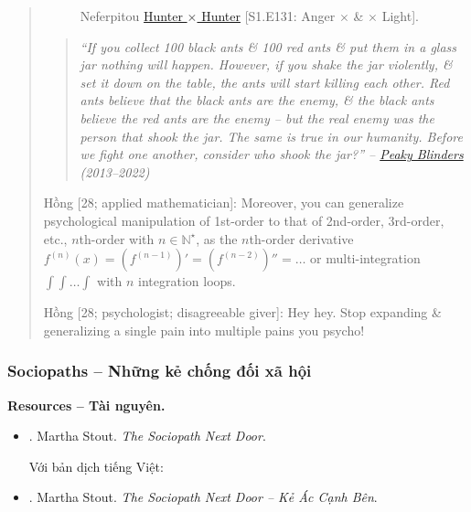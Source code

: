\documentclass[12pt]{article}
\begin{document}
\begin{quote}
\begin{figure}[H]
		\caption{Neferpitou \href{https://www.imdb.com/title/tt3748420/}{Hunter $\times$ Hunter} [S1.E131: Anger $\times$ \& $\times$ Light].}
	\end{figure}
	\begin{quote}\it
		``If you collect 100 black ants \&  100 red ants \& put them in a glass jar nothing will happen. However, if you shake the jar violently, \&  set it down on the table, the ants will start killing each other. Red ants believe that the black ants are the enemy, \&  the black ants believe the red ants are the enemy – but the real enemy was the person that shook the jar. The same is true in our humanity. Before we fight one another, consider who shook the jar?'' -- \href{https://www.imdb.com/title/tt2442560/}{Peaky Blinders} (2013--2022)
	\end{quote}
	
	{\sf Hồng [28; applied mathematician]}: Moreover, you can generalize psychological manipulation of 1st-order to that of 2nd-order, 3rd-order, etc., $n$th-order with $n\in\mathbb{N}^\star$, as the $n$th-order derivative $f^{(n)}(x) = (f^{(n - 1)})' = (f^{(n - 2)})'' = \ldots$ or multi-integration $\int\int\ldots\int$ with $n$ integration loops.
	
	{\sf Hồng [28; psychologist; disagreeable giver]:} Hey hey. Stop expanding \& generalizing a single pain into multiple pains you psycho!
\end{quote}

\subsubsection{Sociopaths -- Những kẻ chống đối xã hội}
\textbf{\textsf{Resources -- Tài nguyên.}}
\begin{itemize}
	\item \cite{Stout_sociopath}. {\sc Martha Stout}. {\it The Sociopath Next Door}.
	
	Với bản dịch tiếng Việt:
	\item \cite{Stout_sociopath_VN}. {\sc Martha Stout}. {\it The Sociopath Next Door -- Kẻ Ác Cạnh Bên}.
\end{itemize}
\end{document}
